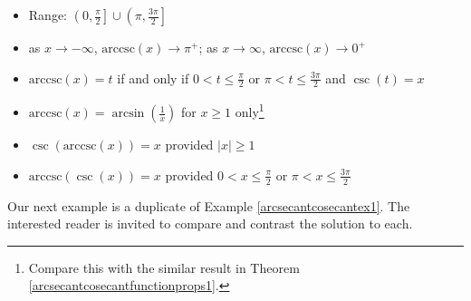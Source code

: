 {\begin{thm}
\begin{itemize}
\begin{itemize}
\item Range: $\left(0, \frac{\pi}{2} \right] \cup \left( \pi, \frac{3\pi}{2} \right]$

\item  as $x \rightarrow -\infty$, $\mbox{arccsc}(x) \rightarrow \pi^{+}$;  as $x \rightarrow \infty$, $\mbox{arccsc}(x) \rightarrow 0^{+}$

\item  $\mbox{arccsc}(x) = t$ if and only if $0 < t \leq \frac{\pi}{2}$ or $\pi < t \leq \frac{3\pi}{2}$ and $\csc(t) = x$

\item  $\mbox{arccsc}(x) = \arcsin\left(\frac{1}{x}\right)$ for $x \geq 1$ only\footnote{Compare this with the similar result in Theorem \ref{arcsecantcosecantfunctionprops1}.}

\item  $\csc\left(\mbox{arccsc}(x)\right) = x$ provided $|x| \geq 1$

\item  $\mbox{arccsc}(\csc(x)) = x$ provided $0 < x \leq \frac{\pi}{2}$ or $\pi < x \leq \frac{3\pi}{2}$

\end{itemize}

\end{itemize}

\end{thm}

\ebm}

\medskip

Our next example is a duplicate of Example \ref{arcsecantcosecantex1}.  The interested reader is invited to compare and contrast the solution to each.


